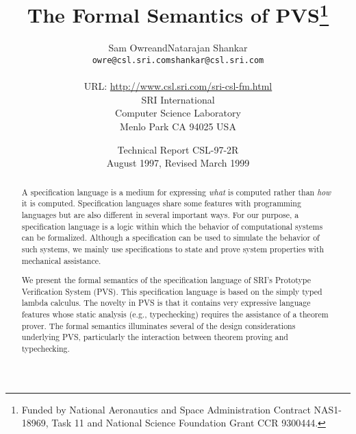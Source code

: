 \documentclass [12pt,twoside]{cslreport}
\title{The Formal Semantics of PVS\thanks{Funded by National Aeronautics
and Space Administration Contract NAS1-18969, Task 11 and National Science
Foundation Grant CCR 9300444. 
}}
\author{
\begin{tabular}{ccc}
Sam Owre & and & Natarajan Shankar\vspace{-.05in}\\
{\small\tt owre@csl.sri.com}& & {\small\tt shankar@csl.sri.com}\\
\end{tabular}\\
URL: \url{http://www.csl.sri.com/sri-csl-fm.html}\\
SRI International\\
Computer Science Laboratory\\
Menlo Park CA 94025 USA
}
\date{Technical Report CSL-97-2R\\August 1997, Revised March 1999}
\begin{document}
%
\maketitle
\setcounter{page}{2}
\mbox{}
\cleardoublepage
\begin{abstract}
\setcounter{page}{3} 
\thispagestyle{plain}

A specification language is a medium for expressing {\em what\/} is
computed rather than {\em how\/} it is computed.  Specification languages
share some features with programming languages but are also different in
several important ways.  For our purpose, a specification language is a
logic within which the behavior of computational systems can be
formalized.  Although a specification can be used to simulate the behavior
of such systems, we mainly use specifications to state and prove system
properties with mechanical assistance.

We present the formal semantics of the specification language of SRI's
Prototype Verification System (PVS)\@.  This specification language is
based on the simply typed lambda calculus.  The novelty in PVS is that it
contains very expressive language features whose static analysis (e.g.,
typechecking) requires the assistance of a theorem prover.  The formal
semantics illuminates several of the design considerations underlying PVS,
particularly the interaction between theorem proving and typechecking.
\end{abstract}
\cleardoublepage
\tableofcontents
\cleardoublepage
\setcounter{page}{0} 
\pagestyle{headings}
\end{document}
